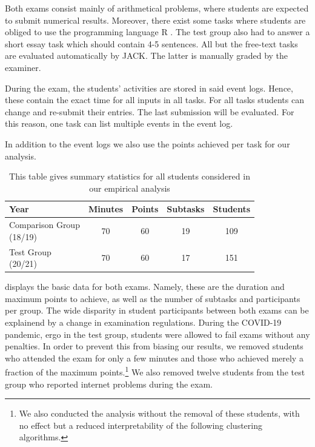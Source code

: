 \documentclass{edm_article}
\begin{document}
Both exams consist mainly of arithmetical problems, where students are expected to submit numerical results. Moreover, there exist some tasks where students are obliged to use the programming language R \cite{R}. The test group also had to answer a short essay task which should contain 4-5 sentences. All but the free-text tasks are evaluated automatically by JACK. The latter is manually graded by the examiner.

During the exam, the students' activities are stored in said event logs. Hence, these contain the exact time for all inputs in all tasks. For all tasks students can change and re-submit their entries. The last submission will be evaluated. For this reason, one task can list multiple events in the event log. 

In addition to the event logs we also use the points achieved per task for our analysis.

\begin{table}
{\footnotesize
	\caption{\label{Tabelle} This table gives summary statistics for all students 			considered in our empirical analysis}
	\begin{center}
	\begin{tabular}[h]{lcccc}
	\toprule
  	Year & Minutes & Points & Subtasks & Students \\ 
  	\midrule
 	\parbox{2cm}{Comparison Group \\ (18/19) \\} & 70      & 60     &  19      & 109 \\
	\parbox{2cm}{Test Group \\ (20/21)}  & 70      & 60     &  17      & 151 \\
	\bottomrule
	\end{tabular}
	\end{center}
}
\end{table}

 displays the basic data for both exams. Namely, these are the duration and maximum points to achieve, as well as the number of subtasks and participants per group. The wide disparity in student participants between both exams can be explainend by a change in examination regulations. During the COVID-19 pandemic, ergo in the test group, students were allowed to fail exams without any penalties. In order to prevent this from biasing our results, we removed students who attended the exam for only a few minutes and those who achieved merely a fraction of the maximum points.\footnote{We also conducted the analysis without the removal of these students, with no effect but a reduced interpretability of the following clustering algorithms.} We also removed twelve students from the test group who reported internet problems during the exam.
\end{document}
